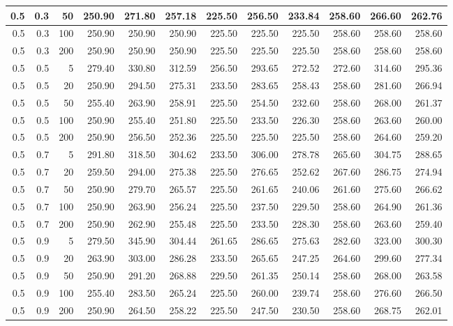 \begin{longtable}{|r|r|r|r|r|r|r|r|r|r|r|r|}
		\hline
		0.5 & 0.3 & 50 & 250.90 & 271.80 & 257.18 & 225.50 & 256.50 & 233.84 & 258.60 & 266.60 & 262.76\\
		\hline
		0.5 & 0.3 & 100 & 250.90 & 250.90 & 250.90 & 225.50 & 225.50 & 225.50 & 258.60 & 258.60 & 258.60\\
		\hline
		0.5 & 0.3 & 200 & 250.90 & 250.90 & 250.90 & 225.50 & 225.50 & 225.50 & 258.60 & 258.60 & 258.60\\
		\hline
		0.5 & 0.5 & 5 & 279.40 & 330.80 & 312.59 & 256.50 & 293.65 & 272.52 & 272.60 & 314.60 & 295.36\\
		\hline
		0.5 & 0.5 & 20 & 250.90 & 294.50 & 275.31 & 233.50 & 283.65 & 258.43 & 258.60 & 281.60 & 266.94\\
		\hline
		0.5 & 0.5 & 50 & 255.40 & 263.90 & 258.91 & 225.50 & 254.50 & 232.60 & 258.60 & 268.00 & 261.37\\
		\hline
		0.5 & 0.5 & 100 & 250.90 & 255.40 & 251.80 & 225.50 & 233.50 & 226.30 & 258.60 & 263.60 & 260.00\\
		\hline
		0.5 & 0.5 & 200 & 250.90 & 256.50 & 252.36 & 225.50 & 225.50 & 225.50 & 258.60 & 264.60 & 259.20\\
		\hline
		0.5 & 0.7 & 5 & 291.80 & 318.50 & 304.62 & 233.50 & 306.00 & 278.78 & 265.60 & 304.75 & 288.65\\
		\hline
		0.5 & 0.7 & 20 & 259.50 & 294.00 & 275.38 & 225.50 & 276.65 & 252.62 & 267.60 & 286.75 & 274.94\\
		\hline
		0.5 & 0.7 & 50 & 250.90 & 279.70 & 265.57 & 225.50 & 261.65 & 240.06 & 261.60 & 275.60 & 266.62\\
		\hline
		0.5 & 0.7 & 100 & 250.90 & 263.90 & 256.24 & 225.50 & 237.50 & 229.50 & 258.60 & 264.90 & 261.36\\
		\hline
		0.5 & 0.7 & 200 & 250.90 & 262.90 & 255.48 & 225.50 & 233.50 & 228.30 & 258.60 & 263.60 & 259.40\\
		\hline
		0.5 & 0.9 & 5 & 279.50 & 345.90 & 304.44 & 261.65 & 286.65 & 275.63 & 282.60 & 323.00 & 300.30\\
		\hline
		0.5 & 0.9 & 20 & 263.90 & 303.00 & 286.28 & 233.50 & 265.65 & 247.25 & 264.60 & 299.60 & 277.34\\
		\hline
		0.5 & 0.9 & 50 & 250.90 & 291.20 & 268.88 & 229.50 & 261.35 & 250.14 & 258.60 & 268.00 & 263.58\\
		\hline
		0.5 & 0.9 & 100 & 255.40 & 283.50 & 265.24 & 225.50 & 260.00 & 239.74 & 258.60 & 276.60 & 266.50\\
		\hline
		0.5 & 0.9 & 200 & 250.90 & 264.50 & 258.22 & 225.50 & 247.50 & 230.50 & 258.60 & 268.75 & 262.01\\

\end{longtable}
